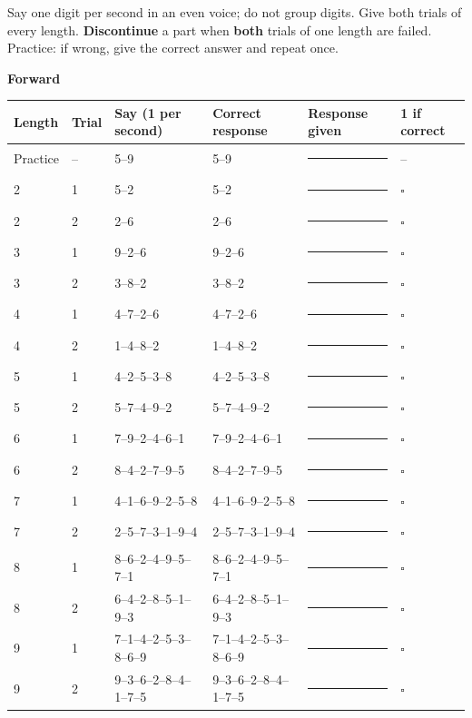 \documentclass[10pt,a4paper]{article}
\newcommand{\blank}[1][1.2cm]{\rule{#1}{0.4pt}}
\newcommand{\bx}{$\square$}
\begin{document}
Say one digit per second in an even voice; do not group digits. Give both trials of every length. \textbf{Discontinue} a part when \textbf{both} trials of one length are failed. Practice: if wrong, give the correct answer and repeat once.
\par{}\medskip\textbf{Forward}\par\begin{longtable}{@{}llp{4.2cm}p{4.2cm}p{3.4cm}l@{}}\toprule Length & Trial & Say (1 per second) & Correct response & Response given & 1 if correct\\ \midrule\endhead
Practice & -- & 5--9 & 5--9 & \blank[3.2cm] & --\\ \midrule
2 & 1 & 5--2 & 5--2 & \blank[3.2cm] & \bx\\
2 & 2 & 2--6 & 2--6 & \blank[3.2cm] & \bx\\\midrule
3 & 1 & 9--2--6 & 9--2--6 & \blank[3.2cm] & \bx\\
3 & 2 & 3--8--2 & 3--8--2 & \blank[3.2cm] & \bx\\\midrule
4 & 1 & 4--7--2--6 & 4--7--2--6 & \blank[3.2cm] & \bx\\
4 & 2 & 1--4--8--2 & 1--4--8--2 & \blank[3.2cm] & \bx\\\midrule
5 & 1 & 4--2--5--3--8 & 4--2--5--3--8 & \blank[3.2cm] & \bx\\
5 & 2 & 5--7--4--9--2 & 5--7--4--9--2 & \blank[3.2cm] & \bx\\\midrule
6 & 1 & 7--9--2--4--6--1 & 7--9--2--4--6--1 & \blank[3.2cm] & \bx\\
6 & 2 & 8--4--2--7--9--5 & 8--4--2--7--9--5 & \blank[3.2cm] & \bx\\\midrule
7 & 1 & 4--1--6--9--2--5--8 & 4--1--6--9--2--5--8 & \blank[3.2cm] & \bx\\
7 & 2 & 2--5--7--3--1--9--4 & 2--5--7--3--1--9--4 & \blank[3.2cm] & \bx\\\midrule
8 & 1 & 8--6--2--4--9--5--7--1 & 8--6--2--4--9--5--7--1 & \blank[3.2cm] & \bx\\
8 & 2 & 6--4--2--8--5--1--9--3 & 6--4--2--8--5--1--9--3 & \blank[3.2cm] & \bx\\\midrule
9 & 1 & 7--1--4--2--5--3--8--6--9 & 7--1--4--2--5--3--8--6--9 & \blank[3.2cm] & \bx\\
9 & 2 & 9--3--6--2--8--4--1--7--5 & 9--3--6--2--8--4--1--7--5 & \blank[3.2cm] & \bx\\\midrule
\bottomrule\end{longtable}
\end{document}
